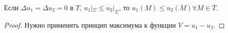 \documentclass[11pt]{article}
\newcounter{th}\setcounter{th}{0}
\newcounter{cnsqnc}\setcounter{cnsqnc}{0}
\def\cnsqnc{\par\smallskip\refstepcounter{cnsqnc}\textbf{\arabic{cnsqnc}}}
\newtheorem*{Consequence}{Следствие \cnsqnc}
\begin{document}
\begin{Consequence}
Если $\Delta u_1 = \Delta u_2 = 0$ в $T$, $u_1|_{\Sigma} \leq u_2|_{\Sigma}$, то $u_1(M) \leq u_2(M) \forall M \in \overline T$.
\begin{proof}
Нужно применить принцип максимума к функции $V = u_1 - u_2$.
\end{proof}
\end{Consequence}
\end{document}
